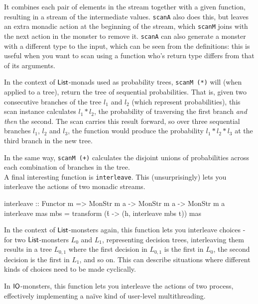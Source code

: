 It combines each pair of elements in the stream together with a given function, resulting in a stream of the intermediate values. \verb+scanA+ also does this, but leaves an extra monadic action at the beginning of the stream, which \verb+scanM+ joins with the next action in the monster to remove it. \verb+scanA+ can also generate a monster with a different type to the input, which can be seen from the definitions: this is useful when you want to scan using a function who's return type differs from that of its arguments.

In the context of $\mathsf{List}$-monads used as probability trees, \verb+scanM (*)+ will (when applied to a tree), return the tree of sequential probabilities. That is, given two consecutive branches of the tree $l_1$ and $l_2$ (which represent probabilities), this scan instance calculates $l_1 * l_2$, the probability of traversing the first branch \emph{and then} the second. The scan carries this result forward, so over three sequential branches $l_1$, $l_2$ and $l_3$, the function would produce the probability $l_1 * l_2 * l_3$ at the third branch in the new tree. 

In the same way, \verb=scanM (+)= calculates the disjoint unions of probabilities across each combination of branches in the tree. \\

A final interesting function is \verb+interleave+. This (unsurprisingly) lets you interleave the actions of two monadic streams.

\begin{haskell}
interleave :: Functor m =>  MonStr m a -> MonStr m a -> MonStr m a
interleave mas mbs = transform (\h t -> (h, interleave mbs t)) mas
\end{haskell}

In the context of $\mathsf{List}$-monsters again, this function lets you interleave choices - for two $\mathsf{List}$-monsters $L_0$ and $L_1$, representing decision trees, interleaving them results in a tree $L_{0,1}$ where the first decision in $L_{0,1}$ is the first in $L_0$, the second decision is the first in $L_1$, and so on. This can describe situations where different kinds of choices need to be made cyclically. 

In $\mathsf{IO}$-monsters, this function lets you interleave the actions of two process, effectively implementing a naïve kind of user-level multithreading.

